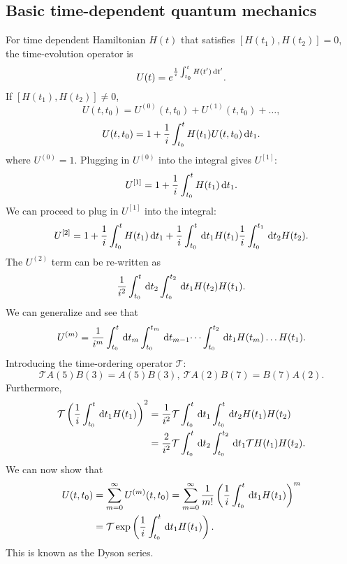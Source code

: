 \documentclass{article}
\begin{document}
\subsection{Basic time-dependent quantum mechanics}
For time dependent Hamiltonian $H(t)$ that satisfies $[H(t_1), H(t_2)]=0$, the time-evolution operator is 
\begin{equation}
    U(t)=e^{\frac{1}{i} \int_{t_0}^{t}H(t')\dl t'}.
\end{equation}
If $[H(t_1), H(t_2)]\neq 0$,
\begin{equation}
    U(t,t_0)=U^{(0)}(t,t_0)+U^{(1)}(t,t_0)+\dots,
\end{equation}
\begin{equation}
    U(t,t_0)=1+\frac{1}{i}\int_{t_0}^tH(t_1)U(t,t_0)\dl t_1.
\end{equation}
where $U^{(0)}=1$. Plugging in $U^{(0)}$ into the integral gives $U^{[1]}$:
\begin{equation}
    U^{[1]}=1+\frac{1}{i}\int_{t_0}^tH(t_1)\dl t_1.
\end{equation}
We can proceed to plug in $U^{[1]}$ into the integral:
\begin{equation}
    U^{[2]}=1+\frac{1}{i}\int_{t_0}^tH(t_1)\dl t_1+\frac{1}{i}\int_{t_0}^t\dl t_1 H(t_1)\frac{1}{i}\int_{t_0}^{t_1}\dl t_2 H(t_2).
\end{equation}
The $U^{(2)}$ term can be re-written as 
\begin{equation}
    \frac{1}{i^2}\int_{t_0}^t\dl t_2 \int^{t_2}_{t_0}\dl t_1 H(t_2)H(t_1).
\end{equation}
We can generalize and see that
\begin{equation}
    U^{(m)}=\frac{1}{i^m}\int_{t_0}^t\dl t_m\int^{t_m}_{t_0}\dl t_{m-1}\dots\int_{t_0}^{t_2}\dl t_1 H(t_m)\dots H(t_1).
\end{equation}
Introducing the time-ordering operator $\mathcal{T}$:
\begin{equation}
    \mathcal{T}A(5)B(3)=A(5)B(3),\ \mathcal{T}A(2)B(7)=B(7)A(2).
\end{equation}
Furthermore,
\begin{align}
    \mathcal{T}\left(\frac{1}{i}\int_{t_0}^t\dl t_1H(t_1)\right)^2&=\frac{1}{i^2}\mathcal{T}\int_{t_0}^t\dl t_1\int_{t_0}^t\dl t_2 H(t_1)H(t_2)\\
    &=\frac{2}{i^2}\mathcal{T}\int_{t_0}^t\dl t_2\int_{t_0}^{t_2}\dl t_1\mathcal{T}H(t_1)H(t_2).
\end{align}
We can now show that
\begin{align}
    U(t,t_0)&=\sum_{m=0}^{\infty}U^{(m)}(t,t_0)=\sum_{m=0}^{\infty}\frac{1}{m!}\left(\frac{1}{i}\int_{t_0}^t\dl t_1H(t_1)\right)^m\\
    &=\mathcal{T}\exp\left(\frac{1}{i}\int_{t_0}^t\dl t_1H(t_1)\right).
\end{align}
This is known as the Dyson series.
\end{document}
